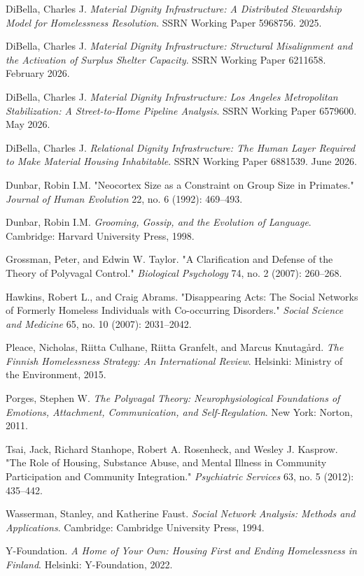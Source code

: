 \documentclass[12pt, letterpaper]{article}
\begin{document}
DiBella, Charles J. \textit{Material Dignity Infrastructure: A Distributed Stewardship Model for Homelessness Resolution}. SSRN Working Paper 5968756. 2025.

DiBella, Charles J. \textit{Material Dignity Infrastructure: Structural Misalignment and the Activation of Surplus Shelter Capacity}. SSRN Working Paper 6211658. February 2026.

DiBella, Charles J. \textit{Material Dignity Infrastructure: Los Angeles Metropolitan Stabilization: A Street-to-Home Pipeline Analysis}. SSRN Working Paper 6579600. May 2026.

DiBella, Charles J. \textit{Relational Dignity Infrastructure: The Human Layer Required to Make Material Housing Inhabitable}. SSRN Working Paper 6881539. June 2026.

Dunbar, Robin I.M. "Neocortex Size as a Constraint on Group Size in Primates." \textit{Journal of Human Evolution} 22, no. 6 (1992): 469--493.

Dunbar, Robin I.M. \textit{Grooming, Gossip, and the Evolution of Language}. Cambridge: Harvard University Press, 1998.

Grossman, Peter, and Edwin W. Taylor. "A Clarification and Defense of the Theory of Polyvagal Control." \textit{Biological Psychology} 74, no. 2 (2007): 260–268.

Hawkins, Robert L., and Craig Abrams. "Disappearing Acts: The Social Networks of Formerly Homeless Individuals with Co-occurring Disorders." \textit{Social Science and Medicine} 65, no. 10 (2007): 2031–2042.

Pleace, Nicholas, Riitta Culhane, Riitta Granfelt, and Marcus Knutagård. \textit{The Finnish Homelessness Strategy: An International Review}. Helsinki: Ministry of the Environment, 2015.

Porges, Stephen W. \textit{The Polyvagal Theory: Neurophysiological Foundations of Emotions, Attachment, Communication, and Self-Regulation}. New York: Norton, 2011.

Tsai, Jack, Richard Stanhope, Robert A. Rosenheck, and Wesley J. Kasprow. "The Role of Housing, Substance Abuse, and Mental Illness in Community Participation and Community Integration." \textit{Psychiatric Services} 63, no. 5 (2012): 435–442.

Wasserman, Stanley, and Katherine Faust. \textit{Social Network Analysis: Methods and Applications}. Cambridge: Cambridge University Press, 1994.

Y-Foundation. \textit{A Home of Your Own: Housing First and Ending Homelessness in Finland}. Helsinki: Y-Foundation, 2022.
\end{document}
